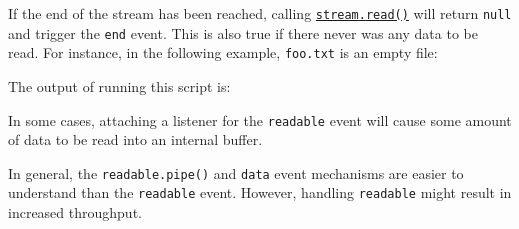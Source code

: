 If the end of the stream has been reached, calling
\hyperref[readablereadsize]{\texttt{stream.read()}} will return
\texttt{null} and trigger the
\texttt{\textquotesingle{}end\textquotesingle{}} event. This is also
true if there never was any data to be read. For instance, in the
following example, \texttt{foo.txt} is an empty file:

\begin{Shaded}
\begin{Highlighting}[]
\OperatorTok{=} \NormalTok{(}\NormalTok{)}\OperatorTok{;}
\OperatorTok{=}\NormalTok{(}\NormalTok{)}\OperatorTok{;}
\NormalTok{(}\OperatorTok{,}\NormalTok{ () }\KeywordTok{=\textgreater{}}\NormalTok{ \{}
  \NormalTok{(}\SpecialCharTok{$\{}\NormalTok{()}\SpecialCharTok{\}}\VerbatimStringTok{\textasciigrave{}}\NormalTok{)}\OperatorTok{;}
\NormalTok{\})}\OperatorTok{;}
\NormalTok{(}\OperatorTok{,}\NormalTok{ () }\KeywordTok{=\textgreater{}}\NormalTok{ \{}
  \NormalTok{(}\NormalTok{)}\OperatorTok{;}
\NormalTok{\})}\OperatorTok{;}
\end{Highlighting}
\end{Shaded}

The output of running this script is:

\begin{Shaded}
\begin{Highlighting}[]
\end{Highlighting}
\end{Shaded}

In some cases, attaching a listener for the
\texttt{\textquotesingle{}readable\textquotesingle{}} event will cause
some amount of data to be read into an internal buffer.

In general, the \texttt{readable.pipe()} and
\texttt{\textquotesingle{}data\textquotesingle{}} event mechanisms are
easier to understand than the
\texttt{\textquotesingle{}readable\textquotesingle{}} event. However,
handling \texttt{\textquotesingle{}readable\textquotesingle{}} might
result in increased throughput.

